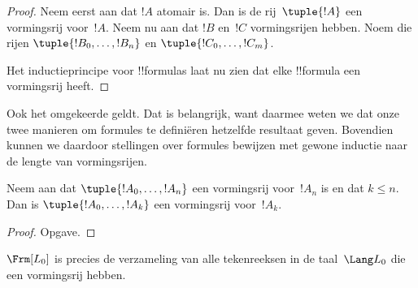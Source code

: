 \documentclass[../../../include/open-logic-section]{subfiles}
\begin{document}
\begin{proof}
Neem eerst aan dat $!A$ atomair is. Dan is de rij~$\tuple{!A}$ een
vormingsrij voor~$!A$.
%
Neem nu aan dat $!B$ en~$!C$ vormingsrijen hebben. Noem die rijen
$\tuple{!B_0,\dotsc,!B_n}$ en $\tuple{!C_0,\dotsc,!C_m}$.
%
\begin{enumerate}
\end{enumerate}
Het inductieprincipe voor !!{formula}s laat nu zien dat elke
!!{formula} een vormingsrij heeft.
\end{proof}

Ook het omgekeerde geldt. Dat is belangrijk, want daarmee weten we dat
onze twee manieren om formules te definiëren hetzelfde resultaat
geven. Bovendien kunnen we daardoor stellingen over formules bewijzen
met gewone inductie naar de lengte van vormingsrijen.

\begin{lem}
Neem aan dat $\tuple{!A_0,\dotsc,!A_n}$ een vormingsrij voor~$!A_n$ is
en dat $k \leq n$. Dan is $\tuple{!A_0,\dotsc,!A_k}$ een vormingsrij
voor~$!A_k$.
\end{lem}

\begin{proof}
Opgave.
\end{proof}

\begin{thm}
$\Frm[L_0]$ is precies de verzameling van alle tekenreeksen in de
taal~$\Lang L_0$ die een vormingsrij hebben.
\end{thm}
\end{document}
